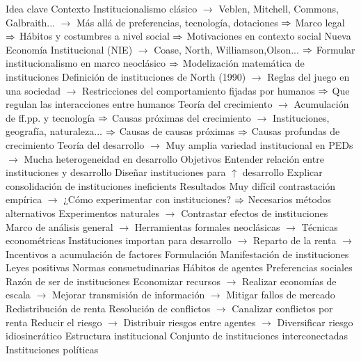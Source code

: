 \documentclass{nuevotema}
\begin{document}
\begin{esquemal}
			\3 Idea clave
				\4 Contexto
				\4[] Institucionalismo clásico
				\4[] $\to$ Veblen, Mitchell, Commons, Galbraith...
				\4[] $\to$ Más allá de preferencias, tecnología, dotaciones
				\4[] $\Rightarrow$ Marco legal
				\4[] $\Rightarrow$ Hábitos y costumbres a nivel social
				\4[] $\Rightarrow$ Motivaciones en contexto social
				\4[] Nueva Economía Institucional (NIE)
				\4[] $\to$ Coase, North, Williamson,Olson...
				\4[] $\Rightarrow$ Formular institucionalismo en marco neoclásico
				\4[] $\Rightarrow$ Modelización matemática de instituciones
				\4[] Definición de instituciones de North (1990)
				\4[] $\to$ Reglas del juego en una sociedad
				\4[] $\to$ Restricciones del comportamiento fijadas por humanos
				\4[] $\Rightarrow$ Que regulan las interacciones entre humanos
				\4[] Teoría del crecimiento
				\4[] $\to$ Acumulación de ff.pp. y tecnología
				\4[] $\Rightarrow$ Causas próximas del crecimiento
				\4[] $\to$ Instituciones, geografía, naturaleza...
				\4[] $\Rightarrow$ Causas de causas próximas
				\4[] $\Rightarrow$ Causas profundas de crecimiento
				\4[] Teoría del desarrollo
				\4[] $\to$ Muy amplia variedad institucional en PEDs
				\4[] $\to$ Mucha heterogeneidad en desarrollo
				\4 Objetivos
				\4[] Entender relación entre instituciones y desarrollo
				\4[] Diseñar instituciones para $\uparrow$ desarrollo
				\4[] Explicar consolidación de instituciones ineficients
				\4 Resultados
				\4[] Muy difícil contrastación empírica
				\4[] $\to$ ¿Cómo experimentar con instituciones?
				\4[] $\Rightarrow$ Necesarios métodos alternativos
				\4[] Experimentos naturales
				\4[] $\to$ Contrastar efectos de instituciones
				\4[] Marco de análisis general
				\4[] $\to$ Herramientas formales neoclásicas
				\4[] $\to$ Técnicas econométricas
				\4[] Instituciones importan para desarrollo
				\4[] $\to$ Reparto de la renta
				\4[] $\to$ Incentivos a acumulación de factores
			\3 Formulación
				\4 Manifestación de instituciones
				\4[] Leyes positivas
				\4[] Normas consuetudinarias
				\4[] Hábitos de agentes
				\4[] Preferencias sociales
				\4 Razón de ser de instituciones
				\4[] Economizar recursos
				\4[] $\to$ Realizar economías de escala
				\4[] $\to$ Mejorar transmisión de información
				\4[] $\to$ Mitigar fallos de mercado
				\4[] Redistribución de renta
				\4[] Resolución de conflictos
				\4[] $\to$ Canalizar conflictos por renta
				\4[] Reducir el riesgo
				\4[] $\to$ Distribuir riesgos entre agentes
				\4[] $\to$ Diversificar riesgo idiosincrático
				\4 Estructura institucional
				\4[] Conjunto de instituciones interconectadas
				\4 Instituciones políticas

\end{esquemal}
\end{document}
